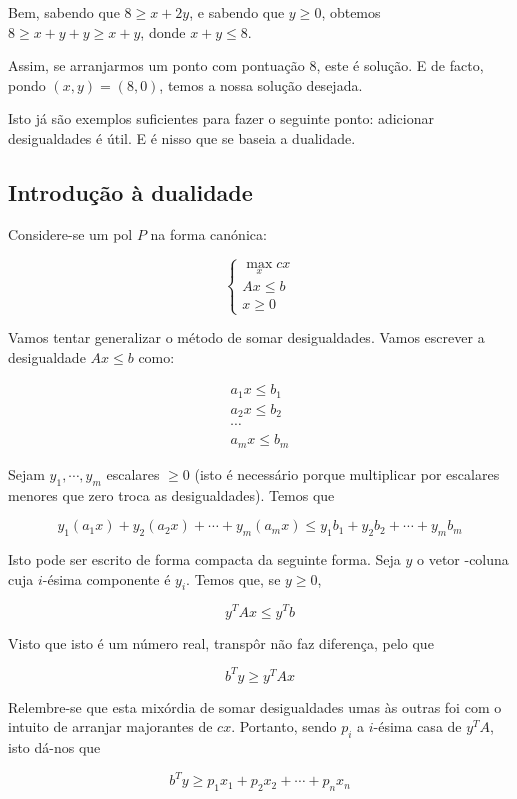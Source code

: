 \documentclass{article}
\theoremstyle{definition}
\begin{document}
	Bem, sabendo que $8 \geq x + 2y$, e sabendo que $y \geq 0$, obtemos $8 \geq x + y + y \geq x + y$, donde $x+y \leq 8$.
	
	Assim, se arranjarmos um ponto com pontuação 8, este é solução. E de facto, pondo $(x,y) = (8,0)$, temos a nossa solução desejada.
	
	Isto já são exemplos suficientes para fazer o seguinte ponto: adicionar desigualdades é útil. E é nisso que se baseia a dualidade.
	
	\subsection{Introdução à dualidade}
	
	Considere-se um pol $P$ na forma canónica:
	
	\[
	\begin{cases}
	\max\limits_x cx\\
	Ax \leq b\\
	x \geq 0
	\end{cases}
	\]
	
	Vamos tentar generalizar o método de somar desigualdades. Vamos escrever a desigualdade $Ax \leq b$ como:
	
	\begin{gather*}
	a_1 x \leq b_1\\
	a_2 x \leq b_2\\
	\cdots\\
	a_m x \leq b_m
	\end{gather*}
	
	Sejam $y_1, \cdots, y_m$ escalares $\geq 0$ (isto é necessário porque multiplicar por escalares menores que zero troca as desigualdades). Temos que
	
	\[y_1 (a_1 x) + y_2 (a_2 x) + \cdots + y_m (a_m x) \leq y_1 b_1 + y_2 b_2 + \cdots + y_m b_m\]
	
	Isto pode ser escrito de forma compacta da seguinte forma. Seja $y$ o vetor -coluna cuja $i$-ésima componente é $y_i$. Temos que, se $y \geq 0$,
	
	\[y^T Ax \leq y^T b\]
	
	Visto que isto é um número real, transpôr não faz diferença, pelo que
	
	\[b^T y \geq y^T Ax\]
	
	Relembre-se que esta mixórdia de somar desigualdades umas às outras foi com o intuito de arranjar majorantes de $cx$. Portanto, sendo $p_i$ a $i$-ésima casa de $y^T A$, isto dá-nos que
	
	\[b^T y \geq p_1 x_1 + p_2 x_2 + \cdots + p_n x_n\]
	
\end{document}
